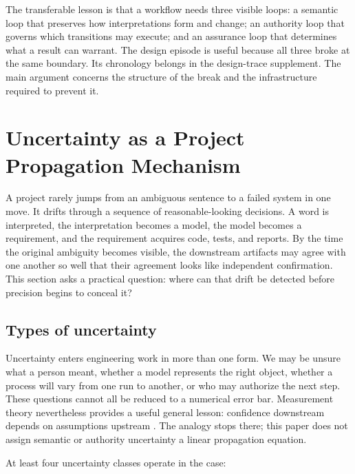 \documentclass[10pt,a4paper]{article}
\begin{document}
The transferable lesson is that a workflow needs three visible loops: a semantic loop that preserves how interpretations form and change; an authority loop that governs which transitions may execute; and an assurance loop that determines what a result can warrant. The design episode is useful because all three broke at the same boundary. Its chronology belongs in the design-trace supplement. The main argument concerns the structure of the break and the infrastructure required to prevent it.

\section{Uncertainty as a Project Propagation Mechanism}

A project rarely jumps from an ambiguous sentence to a failed system in one move. It drifts through a sequence of reasonable-looking decisions. A word is interpreted, the interpretation becomes a model, the model becomes a requirement, and the requirement acquires code, tests, and reports. By the time the original ambiguity becomes visible, the downstream artifacts may agree with one another so well that their agreement looks like independent confirmation. This section asks a practical question: where can that drift be detected before precision begins to conceal it?

\subsection{Types of uncertainty}

Uncertainty enters engineering work in more than one form. We may be unsure what a person meant, whether a model represents the right object, whether a process will vary from one run to another, or who may authorize the next step. These questions cannot all be reduced to a numerical error bar. Measurement theory nevertheless provides a useful general lesson: confidence downstream depends on assumptions upstream \cite{gum2008}. The analogy stops there; this paper does not assign semantic or authority uncertainty a linear propagation equation.

At least four uncertainty classes operate in the case:
\end{document}
